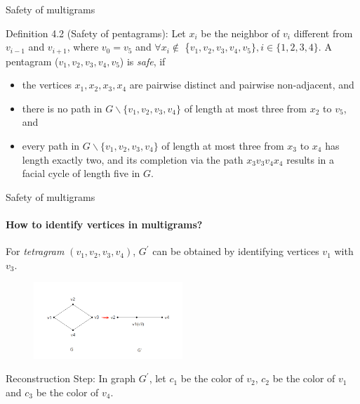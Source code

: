 \documentclass{beamer}
\begin{document}
\begin{frame}{Safety of multigrams}
\begin{block}{Definition 4.2 (Safety of pentagrams):}
    Let $x_i$ be the neighbor of $v_i$ different from $v_{i-1}$ and $v_{i+1}$, where $v_0 = v_5$ and $\forall x_i \notin$ \{$v_1, v_2, v_3, v_4, v_5\}, i \in \{1, 2, 3, 4\}$. A pentagram ($v_1, v_2, v_3, v_4, v_5$) is \textit{safe}, if
\begin{itemize}
    \item the vertices $x_1, x_2, x_3, x_4$ are pairwise distinct and pairwise non-adjacent, and
    \item there is no path in $G \backslash \{v_1, v_2, v_3, v_4\}$ of length at most three from $x_2$ to $v_5$, and
    \item every path in $G \backslash \{v_1, v_2, v_3, v_4\}$ of length at most three from $x_3$ to $x_4$ has length exactly two, and its completion via the path $x_3v_3v_4x_4$ results in a facial cycle of length five in $G$.
\end{itemize}
\end{block}
    
\end{frame}

\begin{frame}{Safety of multigrams}
\framesubtitle{How to identify vertices in multigrams?}
\begin{block}{}
For \textit{tetragram} $(v_1, v_2, v_3, v_4)$, $G^{'}$ can be obtained by identifying vertices $v_1$ with $v_3$. 
\end{block}
\begin{figure}[H] %
\centering %
\includegraphics[width=0.5\textwidth]{figure/identifyingv1v3.png} 
\label{figure} %
\end{figure}

\begin{block}{Reconstruction Step:}
In graph $G^{'}$, let $c_1$ be the color of $v_2$, $c_2$ be the color of $v_1$ and $c_3$ be the color of $v_4$.
\end{block}
\end{frame}
\end{document}
